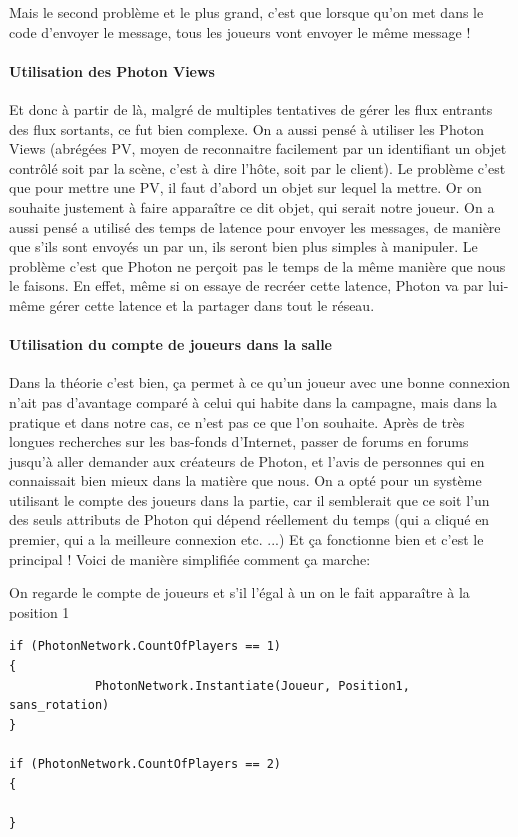 \documentclass{article}
\begin{document}
Mais le second problème et le plus grand, c'est que lorsque qu'on met dans le code d'envoyer le message, tous les joueurs vont envoyer le même message !

\paragraph{Utilisation des Photon Views}

Et donc à partir de là, malgré de multiples tentatives de gérer les flux entrants des flux sortants, ce fut bien complexe. On a aussi pensé à utiliser les Photon Views (abrégées PV, moyen de reconnaitre facilement par un identifiant un objet contrôlé soit par la scène, c'est à dire l'hôte, soit par le client). Le problème c'est que pour mettre une PV, il faut d'abord un objet sur lequel la mettre. Or on souhaite justement à faire apparaître ce dit objet, qui serait notre joueur.   
On a aussi pensé a utilisé des temps de latence pour envoyer les messages, de manière que s'ils sont envoyés un par un, ils seront bien plus simples à manipuler. Le problème c'est que Photon ne perçoit pas le temps de la même manière que nous le faisons. En effet, même si on essaye de recréer cette latence, Photon va par lui-même gérer cette latence et la partager dans tout le réseau. 

\paragraph{Utilisation du compte de joueurs dans la salle}

Dans la théorie c'est bien, ça permet à ce qu'un joueur avec une bonne connexion n'ait pas d'avantage comparé à celui qui habite dans la campagne, mais dans la pratique et dans notre cas, ce n'est pas ce que l'on souhaite. Après de très longues recherches sur les bas-fonds d'Internet, passer de forums en forums jusqu'à aller demander aux créateurs de Photon, et l'avis de personnes qui en connaissait bien mieux dans la matière que nous. On a opté pour un système utilisant le compte des joueurs dans la partie, car il semblerait que ce soit l'un des seuls attributs de Photon qui dépend réellement du temps (qui a cliqué en premier, qui a la meilleure connexion etc. ...) Et ça fonctionne bien et c'est le principal !
\newpage
Voici de manière simplifiée comment ça marche:

On regarde le compte de joueurs et s'il l'égal à un on le fait apparaître à la position 1
\begin{lstlisting}
if (PhotonNetwork.CountOfPlayers == 1)
{
            PhotonNetwork.Instantiate(Joueur, Position1, sans_rotation)
}

if (PhotonNetwork.CountOfPlayers == 2)
{
            
}
\end{lstlisting}
\end{document}
